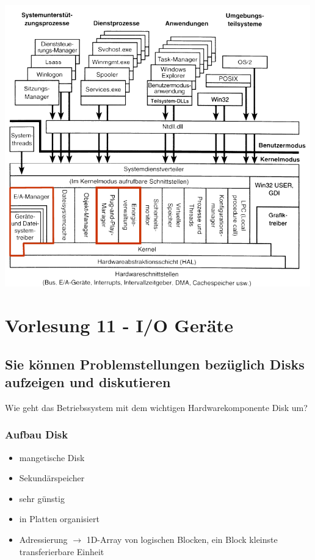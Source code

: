 \documentclass{report}
\newenvironment{Figure}
	{\par\medskip\noindent\minipage{\linewidth}}
	{\endminipage\par\medskip}
\theoremstyle{definition}
\theoremstyle{example}
\begin{document}
\begin{Figure}
\centering
\includegraphics[width=500px]{img/WindowsNTArchitektur.png}
	\label{fig:Abbildung des NT Architektur in Windows}
\end{Figure}



\chapter{Vorlesung 11 - I/O Geräte}

\section{Sie können Problemstellungen bezüglich Disks aufzeigen und diskutieren}
Wie geht das Betriebssystem mit dem wichtigen Hardwarekomponente Disk um? 

	\subsection{Aufbau Disk}
\begin{itemize}
	\item mangetische Disk
	\item Sekundärspeicher
	\item sehr günstig
	\item in Platten organisiert
	\item Adressierung $\rightarrow$ 1D-Array von logischen Blocken, ein Block kleinste transferierbare Einheit
\end{itemize}
\end{document}

